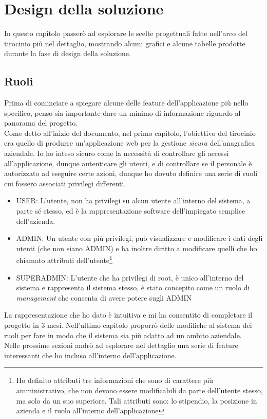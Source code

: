 \chapter{Design della soluzione}
In questo capitolo passerò ad esplorare le scelte progettuali fatte nell'arco del tirocinio più nel dettaglio, mostrando alcuni grafici e alcune tabelle prodotte durante la fase di design della soluzione.



\section{Ruoli}
Prima di cominciare a spiegare alcune delle feature dell'applicazione più nello specifico, penso sia importante dare un minimo di informazione riguardo al panorama del progetto.
\\
Come detto all'inizio del documento, nel primo capitolo, l'obiettivo del tirocinio era quello di produrre un'applicazione web per la gestione \textit{sicura} dell'anagrafica aziendale. Io ho inteso sicuro come la necessità di controllare gli accessi all'applicazione, dunque autenticare gli utenti, e di controllare se il personale è autorizzato ad eseguire certe azioni, dunque ho dovuto definire una serie di ruoli cui fossero associati privilegi differenti.
\begin{itemize}
    \item USER: L'utente, non ha privilegi su alcun utente all'interno del sistema, a parte sé stesso, ed è la rappresentazione software dell'impiegato semplice dell'azienda.
    \item ADMIN: Un utente con più privilegi, può visualizzare e modificare i dati degli utenti (che non siano ADMIN) e ha inoltre diritto a modificare quelli che ho chiamato attributi dell'utente\footnote{
    Ho definito attributi tre informazioni che sono di carattere più amministrativo, che non devono essere modificabili da parte dell'utente stesso, ma solo da un suo superiore. Tali attributi sono: lo stipendio, la posizione in azienda e il ruolo all'interno dell'applicazione
    }
    \item SUPERADMIN: L'utente che ha privilegi di root, è unico all'interno del sistema e rappresenta il sistema stesso, è stato concepito come un ruolo di \emph{management} che consenta di avere potere sugli ADMIN
\end{itemize}
La rappresentazione che ho dato è intuitiva e mi ha consentito di completare il progetto in 3 mesi. Nell'ultimo capitolo proporrò delle modifiche al sistema dei ruoli per fare in modo che il sistema sia più adatto ad un ambito aziendale.
\\
Nelle prossime sezioni andrò ad esplorare nel dettaglio una serie di feature interessanti che ho incluso all'interno dell'applicazione.



